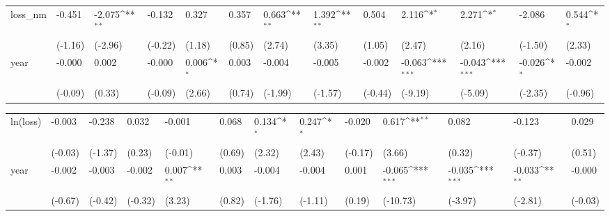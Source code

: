 \def\sym#1{\ifmmode^{#1}\else\(^{#1}\)\fi}
\begin{tabular}{p{1.5cm} p{1.7cm} p{1.7cm} p{1.7cm}  p{1.7cm} p{1.7cm} p{1.7cm} p{1.7cm} p{1.7cm}  p{1.7cm} p{1.7cm} p{1.7cm} p{1.7cm} }
\hline
loss\_nm         &   -0.451         &   -2.075\sym{**} &   -0.132         &    0.327         &    0.357         &    0.663\sym{**} &    1.392\sym{**} &    0.504         &    2.116\sym{*}  &    2.271\sym{*}  &   -2.086         &    0.544\sym{*}  \\
                &  (-1.16)         &  (-2.96)         &  (-0.22)         &   (1.18)         &   (0.85)         &   (2.74)         &   (3.35)         &   (1.05)         &   (2.47)         &   (2.16)         &  (-1.50)         &   (2.33)         \\
year            &   -0.000         &    0.002         &   -0.000         &    0.006\sym{*}  &    0.003         &   -0.004         &   -0.005         &   -0.002         &   -0.063\sym{***}&   -0.043\sym{***}&   -0.026\sym{*}  &   -0.002         \\
                &  (-0.09)         &   (0.33)         &  (-0.09)         &   (2.66)         &   (0.74)         &  (-1.99)         &  (-1.57)         &  (-0.44)         &  (-9.19)         &  (-5.09)         &  (-2.35)         &  (-0.96)         \\
\end{tabular}
\def\sym#1{\ifmmode^{#1}\else\(^{#1}\)\fi}
\begin{tabular}{p{1.5cm} p{1.7cm} p{1.7cm} p{1.7cm}  p{1.7cm} p{1.7cm} p{1.7cm} p{1.7cm} p{1.7cm}  p{1.7cm} p{1.7cm} p{1.7cm} p{1.7cm} }
\hline
ln(loss)        &   -0.003         &   -0.238         &    0.032         &   -0.001         &    0.068         &    0.134\sym{*}  &    0.247\sym{*}  &   -0.020         &    0.617\sym{**} &    0.082         &   -0.123         &    0.029         \\
                &  (-0.03)         &  (-1.37)         &   (0.23)         &  (-0.01)         &   (0.69)         &   (2.32)         &   (2.43)         &  (-0.17)         &   (3.66)         &   (0.32)         &  (-0.37)         &   (0.51)         \\
year            &   -0.002         &   -0.003         &   -0.002         &    0.007\sym{**} &    0.003         &   -0.004         &   -0.004         &    0.001         &   -0.065\sym{***}&   -0.035\sym{***}&   -0.033\sym{**} &   -0.000         \\
                &  (-0.67)         &  (-0.42)         &  (-0.32)         &   (3.23)         &   (0.82)         &  (-1.76)         &  (-1.11)         &   (0.19)         & (-10.73)         &  (-3.97)         &  (-2.81)         &  (-0.03)         \\
\end{tabular}
